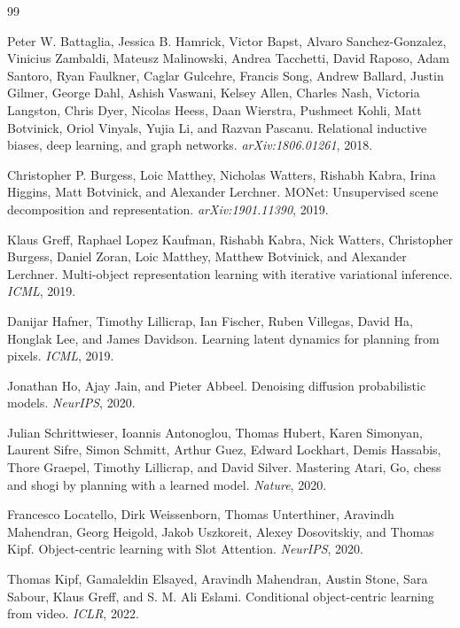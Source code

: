 \documentclass[10pt]{article}
\begin{document}
\begin{thebibliography}{99}

Peter W. Battaglia, Jessica B. Hamrick, Victor Bapst, Alvaro Sanchez-Gonzalez, Vinicius Zambaldi, Mateusz Malinowski, Andrea Tacchetti, David Raposo, Adam Santoro, Ryan Faulkner, Caglar Gulcehre, Francis Song, Andrew Ballard, Justin Gilmer, George Dahl, Ashish Vaswani, Kelsey Allen, Charles Nash, Victoria Langston, Chris Dyer, Nicolas Heess, Daan Wierstra, Pushmeet Kohli, Matt Botvinick, Oriol Vinyals, Yujia Li, and Razvan Pascanu.
\newblock Relational inductive biases, deep learning, and graph networks.
\newblock \emph{arXiv:1806.01261}, 2018.

Christopher P. Burgess, Loic Matthey, Nicholas Watters, Rishabh Kabra, Irina Higgins, Matt Botvinick, and Alexander Lerchner.
\newblock MONet: Unsupervised scene decomposition and representation.
\newblock \emph{arXiv:1901.11390}, 2019.

Klaus Greff, Raphael Lopez Kaufman, Rishabh Kabra, Nick Watters, Christopher Burgess, Daniel Zoran, Loic Matthey, Matthew Botvinick, and Alexander Lerchner.
\newblock Multi-object representation learning with iterative variational inference.
\newblock \emph{ICML}, 2019.

Danijar Hafner, Timothy Lillicrap, Ian Fischer, Ruben Villegas, David Ha, Honglak Lee, and James Davidson.
\newblock Learning latent dynamics for planning from pixels.
\newblock \emph{ICML}, 2019.

Jonathan Ho, Ajay Jain, and Pieter Abbeel.
\newblock Denoising diffusion probabilistic models.
\newblock \emph{NeurIPS}, 2020.

Julian Schrittwieser, Ioannis Antonoglou, Thomas Hubert, Karen Simonyan, Laurent Sifre, Simon Schmitt, Arthur Guez, Edward Lockhart, Demis Hassabis, Thore Graepel, Timothy Lillicrap, and David Silver.
\newblock Mastering Atari, Go, chess and shogi by planning with a learned model.
\newblock \emph{Nature}, 2020.

Francesco Locatello, Dirk Weissenborn, Thomas Unterthiner, Aravindh Mahendran, Georg Heigold, Jakob Uszkoreit, Alexey Dosovitskiy, and Thomas Kipf.
\newblock Object-centric learning with Slot Attention.
\newblock \emph{NeurIPS}, 2020.

Thomas Kipf, Gamaleldin Elsayed, Aravindh Mahendran, Austin Stone, Sara Sabour, Klaus Greff, and S. M. Ali Eslami.
\newblock Conditional object-centric learning from video.
\newblock \emph{ICLR}, 2022.


\end{thebibliography}
\end{document}
